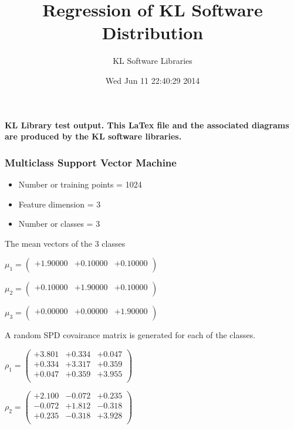 \documentclass[9pt]{article}
\theoremstyle{plain}
\theoremstyle{definition}
\theoremstyle{remark}
\numberwithin{equation}{section}
\begin{document}
\title{Regression of KL Software Distribution   }
\author{KL Software Libraries}
\date{Wed Jun 11 22:40:29 2014
}
\maketitle
\textbf{ KL Library test output.  This LaTex file and the associated diagrams are produced by the KL software libraries.}
\subsubsection{Multiclass Support Vector Machine }
\begin{itemize}
\item Number or training points = 1024
\item Feature dimension = 3
\item Number or classes = 3
\end{itemize}
{The mean vectors of the 3 classes}

$\mu_1 = \left(
\begin{array}{
ccc}
+1.90000 & +0.10000 & +0.10000 \\
\end{array}
\right)$ \newline 

$\mu_2 = \left(
\begin{array}{
ccc}
+0.10000 & +1.90000 & +0.10000 \\
\end{array}
\right)$ \newline 

$\mu_3 = \left(
\begin{array}{
ccc}
+0.00000 & +0.00000 & +1.90000 \\
\end{array}
\right)$ \newline 

A random SPD covairance matrix is generated for each of the classes.\newline

$\rho_1 = \left(
\begin{array}{
ccc}
+3.801 & +0.334 & +0.047 \\
+0.334 & +3.317 & +0.359 \\
+0.047 & +0.359 & +3.955 \\
\end{array}
\right)$ \newline 

$\rho_2 = \left(
\begin{array}{
ccc}
+2.100 & -0.072 & +0.235 \\
-0.072 & +1.812 & -0.318 \\
+0.235 & -0.318 & +3.928 \\
\end{array}
\right)$ \newline 
\end{document}
